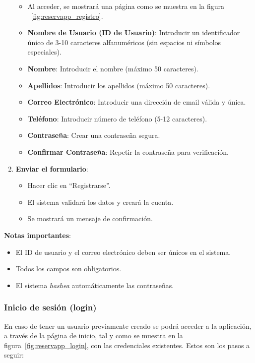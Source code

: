 \begin{enumerate}
\begin{itemize}
      \item Al acceder, se mostrará una página como se muestra en la figura ~\ref{fig:reservapp_registro}.
      \item \textbf{Nombre de Usuario (ID de Usuario)}: Introducir un identificador único de 3-10 caracteres alfanuméricos (sin espacios ni símbolos especiales).
      \item \textbf{Nombre}: Introducir el nombre (máximo 50 caracteres).
      \item \textbf{Apellidos}: Introducir los apellidos (máximo 50 caracteres).
      \item \textbf{Correo Electrónico}: Introducir una dirección de email válida y única.
      \item \textbf{Teléfono}: Introducir número de teléfono (5-12 caracteres).
      \item \textbf{Contraseña}: Crear una contraseña segura.
      \item \textbf{Confirmar Contraseña}: Repetir la contraseña para verificación.
   \end{itemize}
   \item \textbf{Enviar el formulario}:
   \begin{itemize}
      \item Hacer clic en ``Registrarse''.
      \item El sistema validará los datos y creará la cuenta.
      \item Se mostrará un mensaje de confirmación.
   \end{itemize}
\end{enumerate}

\textbf{Notas importantes}:
\begin{itemize}
   \item El ID de usuario y el correo electrónico deben ser únicos en el sistema.
   \item Todos los campos son obligatorios.
   \item El sistema \emph{hashea} automáticamente las contraseñas.
\end{itemize}

\subsubsection{Inicio de sesión (login)}
En caso de tener un usuario previamente creado se podrá acceder a la aplicación, a través de la página de inicio, tal y como se muestra en la figura~\ref{fig:reservapp_login}, con las credenciales existentes. Estos son los pasos a seguir:

